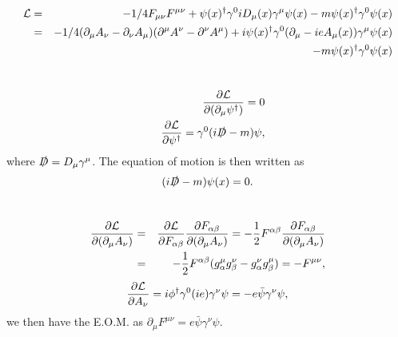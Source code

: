 \documentclass[11pt]{article}
\def\del{{\partial}}
\begin{document}
\section{ }
\begin{eqnarray}
    {\cal L} &=& -1/4 F_{\mu\nu} F^{\mu\nu}
      + \psi(x)^\dagger \gamma^0 i D_\mu(x) \gamma^\mu \psi(x)
      - m \psi(x)^\dagger \gamma^0 \psi(x) \\
      &=& -1/4 (\del_\mu A_\nu-\del_\nu A_\mu)(\del^\mu A^\nu-\del^\nu A^\mu) 
      + i \psi(x)^\dagger \gamma^0  (\del_\mu - i e A_\mu (x)) \gamma^\mu \psi(x) \\ && - m \psi(x)^\dagger \gamma^0 \psi(x)
  \end{eqnarray}

\section{ }
 \begin{eqnarray}
     &&\frac{\del {\cal L}}{\del (\del_\mu \psi^\dagger)} =0 \\
     &&\frac{\del {\cal L}}{\del  \psi^\dagger} =  \gamma^0 (i {\slashed D} -m) \psi,
 \end{eqnarray}
where ${\slashed D}=D_\mu \gamma^\mu$. The equation of motion is then written as 
\begin{eqnarray}
    (i {\slashed D} -m) \psi(x) = 0.
\end{eqnarray}
\section{ }
\begin{eqnarray}
    \frac{\del {\cal L}}{\del (\del_\mu A_\nu)} &=&\frac{\del {\cal L}}{\del F_{\alpha \beta}}\frac{\del F_{\alpha \beta}}{\del (\del_\mu A_\nu)} = -\frac{1}{2} F^{\alpha \beta} \frac{\del F_{\alpha \beta}}{\del (\del_\mu A_\nu)} \\
    &=& -\frac{1}{2} F^{\alpha \beta} (g^\mu_\alpha g^\nu_\beta-g^\nu_\alpha g^\mu_\beta) = -F^{\mu \nu},
\end{eqnarray}
\begin{eqnarray}
    \frac{\del {\cal L}}{\del A_\nu} = i \phi^\dagger \gamma^0 (ie) \gamma^\nu \psi = - e \bar \psi \gamma^\nu \psi,
\end{eqnarray}
we then have the E.O.M. as
$\del_\mu F^{\mu \nu} = e \bar \psi \gamma^\nu \psi$.
\end{document}
